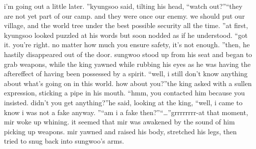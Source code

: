 i’m going out a little later.
”kyungsoo said, tilting his head, “watch out?”“they are not yet part of our camp.
 and they were once our enemy.
 we should put our village, and the world tree under the best possible security all the time.
”at first, kyungsoo looked puzzled at his words but soon nodded as if he understood.
“got it.
 you’re right.
 no matter how much you ensure safety, it’s not enough.
”then, he hastily disappeared out of the door.
sungwoo stood up from his seat and began to grab weapons, while the king yawned while rubbing his eyes as he was having the aftereffect of having been possessed by a spirit.
“well, i still don’t know anything about what’s going on in this world.
 how about you?”the king asked with a sullen expression, sticking a pipe in his mouth.
 “hmm, you contacted him because you insisted.
 didn’t you get anything?”he said, looking at the king, “well, i came to know i was not a fake anyway.
”“am i a fake then?”“…”grrrrrrrr-at that moment, mir woke up whining.
 it seemed that mir was awakened by the sound of him picking up weapons.
 mir yawned and raised his body, stretched his legs, then tried to snug back into sungwoo’s arms.

